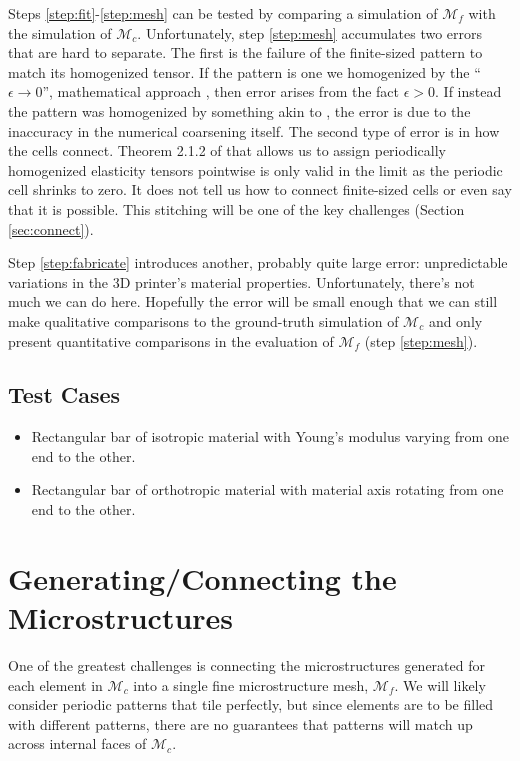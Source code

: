 \documentclass[10pt]{article}
\providecommand{\mesh}{\mathcal{M}}
\begin{document}
Steps \ref{step:fit}-\ref{step:mesh} can be tested by comparing a simulation of
$\mesh_f$ with the simulation of $\mesh_c$. Unfortunately, step \ref{step:mesh}
accumulates two errors that are hard to separate. The first is the failure of
the finite-sized pattern to match its homogenized tensor. If the pattern is one
we homogenized by the ``$\epsilon \to 0$'', mathematical approach
\cite{allaire2002shape}, then error arises from the fact $\epsilon > 0$. If
instead the pattern was homogenized by something akin to \cite{Kharevych2009},
the error is due to the inaccuracy in the numerical coarsening itself. The
second type of error is in how the cells connect. Theorem 2.1.2 of
\cite{allaire2002shape} that allows us to assign periodically homogenized
elasticity tensors pointwise is only valid in the limit as the periodic cell
shrinks to zero. It does not tell us how to connect finite-sized cells or even
say that it is possible. This stitching will be one of the key challenges
(Section \ref{sec:connect}).

Step \ref{step:fabricate} introduces another, probably quite large error: unpredictable
variations in the 3D printer's material properties. Unfortunately, there's not
much we can do here. Hopefully the error will be small enough that we can still
make qualitative comparisons to the ground-truth simulation of $\mesh_c$ and
only present quantitative comparisons in the evaluation of $\mesh_f$ (step
\ref{step:mesh}).

\subsection{Test Cases}
\begin{itemize}
    \item Rectangular bar of isotropic material with Young's modulus varying from one end
        to the other.
    \item Rectangular bar of orthotropic material with material axis rotating
        from one end to the other.
\end{itemize}

\section{Generating/Connecting the Microstructures}
\label{sec:gen_connect}
One of the greatest challenges is connecting the microstructures generated for
each element in $\mesh_c$ into a single fine microstructure mesh, $\mesh_f$. We
will likely consider periodic patterns that tile perfectly, but since elements
are to be filled with different patterns, there are no guarantees that patterns
will match up across internal faces of $\mesh_c$.
\end{document}
